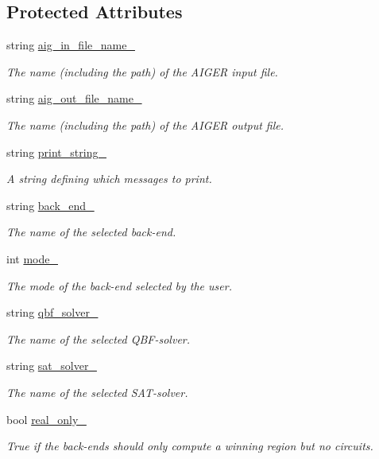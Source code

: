 \subsection*{Protected Attributes}
\begin{DoxyCompactItemize}
\item 
string \hyperlink{classOptions_a334d015adb6fd67b0b1ce3663cd8ce02}{aig\-\_\-in\-\_\-file\-\_\-name\-\_\-}
\begin{DoxyCompactList}\small\item\em The name (including the path) of the A\-I\-G\-E\-R input file. \end{DoxyCompactList}\item 
string \hyperlink{classOptions_a35b7f590e9d752f297d3a99f855da970}{aig\-\_\-out\-\_\-file\-\_\-name\-\_\-}
\begin{DoxyCompactList}\small\item\em The name (including the path) of the A\-I\-G\-E\-R output file. \end{DoxyCompactList}\item 
string \hyperlink{classOptions_a6a29a69625b7962036c8c39746afc5c3}{print\-\_\-string\-\_\-}
\begin{DoxyCompactList}\small\item\em A string defining which messages to print. \end{DoxyCompactList}\item 
string \hyperlink{classOptions_ab049675ae9fd3fc7693dfa53266da8c8}{back\-\_\-end\-\_\-}
\begin{DoxyCompactList}\small\item\em The name of the selected back-\/end. \end{DoxyCompactList}\item 
int \hyperlink{classOptions_a4554d07501f73bbccb9e2628016f2d20}{mode\-\_\-}
\begin{DoxyCompactList}\small\item\em The mode of the back-\/end selected by the user. \end{DoxyCompactList}\item 
string \hyperlink{classOptions_a07391a51f78315a8e8d2ecbeb8f57ddd}{qbf\-\_\-solver\-\_\-}
\begin{DoxyCompactList}\small\item\em The name of the selected Q\-B\-F-\/solver. \end{DoxyCompactList}\item 
string \hyperlink{classOptions_af68f26928f23fda3bdc75c4b43ae17bc}{sat\-\_\-solver\-\_\-}
\begin{DoxyCompactList}\small\item\em The name of the selected S\-A\-T-\/solver. \end{DoxyCompactList}\item 
bool \hyperlink{classOptions_a2e3668079f6c62e087edd486d19bf84a}{real\-\_\-only\-\_\-}
\begin{DoxyCompactList}\small\item\em True if the back-\/ends should only compute a winning region but no circuits. \end{DoxyCompactList}\end{DoxyCompactItemize}
